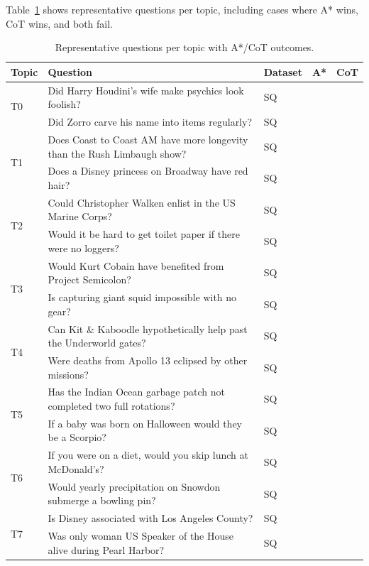 \documentclass{article}
\newcommand{\cmark}{\textcolor{OliveGreen}{\ding{51}}}
\newcommand{\xmark}{\textcolor{BrickRed}{\ding{55}}}
\begin{document}
Table~\ref{tab:topic_examples} shows representative questions per topic,
including cases where A* wins, CoT wins, and both fail.

\begin{table}[h]
\centering
\caption{Representative questions per topic with A*/CoT outcomes.}
\label{tab:topic_examples}
\small
\setlength{\tabcolsep}{3pt}
\begin{tabular}{@{}lp{7.5cm}lcc@{}}
\toprule
\textbf{Topic} & \textbf{Question} & \textbf{Dataset} & \textbf{A*} & \textbf{CoT} \\
\midrule
\multirow{2}{*}{T0} & Did Harry Houdini's wife make psychics look foolish? & SQ & \cmark & \xmark \\
& Did Zorro carve his name into items regularly? & SQ & \xmark & \cmark \\[4pt]
\multirow{2}{*}{T1} & Does Coast to Coast AM have more longevity than the Rush Limbaugh show? & SQ & \cmark & \xmark \\
& Does a Disney princess on Broadway have red hair? & SQ & \xmark & \cmark \\[4pt]
\multirow{2}{*}{T2} & Could Christopher Walken enlist in the US Marine Corps? & SQ & \cmark & \xmark \\
& Would it be hard to get toilet paper if there were no loggers? & SQ & \xmark & \cmark \\[4pt]
\multirow{2}{*}{T3} & Would Kurt Cobain have benefited from Project Semicolon? & SQ & \cmark & \xmark \\
& Is capturing giant squid impossible with no gear? & SQ & \xmark & \cmark \\[4pt]
\multirow{2}{*}{T4} & Can Kit \& Kaboodle hypothetically help past the Underworld gates? & SQ & \cmark & \xmark \\
& Were deaths from Apollo 13 eclipsed by other missions? & SQ & \xmark & \cmark \\[4pt]
\multirow{2}{*}{T5} & Has the Indian Ocean garbage patch not completed two full rotations? & SQ & \cmark & \xmark \\
& If a baby was born on Halloween would they be a Scorpio? & SQ & \xmark & \cmark \\[4pt]
\multirow{2}{*}{T6} & If you were on a diet, would you skip lunch at McDonald's? & SQ & \cmark & \xmark \\
& Would yearly precipitation on Snowdon submerge a bowling pin? & SQ & \xmark & \cmark \\[4pt]
\multirow{2}{*}{T7} & Is Disney associated with Los Angeles County? & SQ & \cmark & \xmark \\
& Was only woman US Speaker of the House alive during Pearl Harbor? & SQ & \xmark & \cmark \\
\bottomrule
\end{tabular}
\end{table}
\end{document}
